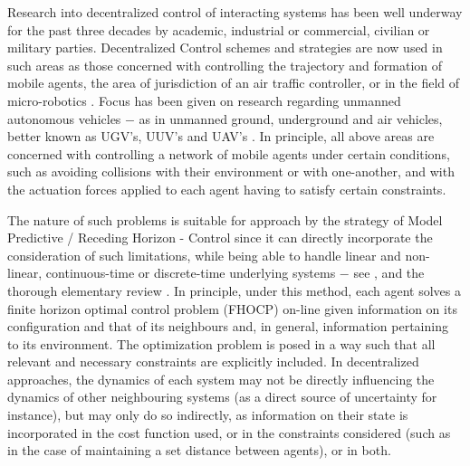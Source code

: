 Research into decentralized control of interacting systems has been well
underway for the past three decades by academic, industrial or commercial,
civilian or military parties. Decentralized Control schemes and strategies are
now used in such areas as those concerned with controlling the trajectory and
formation of mobile agents, the area of jurisdiction of an air traffic
controller\cite{4459797}, or in the field of micro-robotics
\cite{iswarm}\cite{micron}. Focus has been given on research regarding unmanned
autonomous vehicles $-$ as in unmanned ground,
underground and air vehicles, better known as UGV's, UUV's and
UAV's \cite{1429425}\cite{Dunbar2006549}\cite{4389042}\cite{1470732}.
In principle, all above areas are concerned with controlling a network of
mobile agents under certain conditions, such as avoiding collisions with their
environment or with one-another, and with the actuation forces applied to each
agent having to satisfy certain constraints.

The nature of such problems is suitable for approach by the strategy of
Model Predictive / Receding Horizon - Control since it can directly incorporate
the consideration of such limitations, while being able to handle linear and
non-linear, continuous-time or discrete-time underlying systems $-$ see
\cite{FINDEISEN2003190}\cite{262032}\cite{grune2016nonlinear}, and the thorough
elementary review \cite{Mayne2000789}. In principle, under this method, each
agent solves a finite horizon optimal control problem (FHOCP) on-line given
information on its configuration and that of its neighbours and, in general,
information pertaining to its environment. The optimization problem is posed in
a way such that all relevant and necessary constraints are explicitly
included. In decentralized approaches, the dynamics of each system may not be
directly influencing the dynamics of other neighbouring systems (as a direct
source of uncertainty for instance), but may only do so indirectly, as
information on their state is incorporated in the cost function used, or in the
constraints considered (such as in the case of maintaining a set distance
between agents), or in both.

